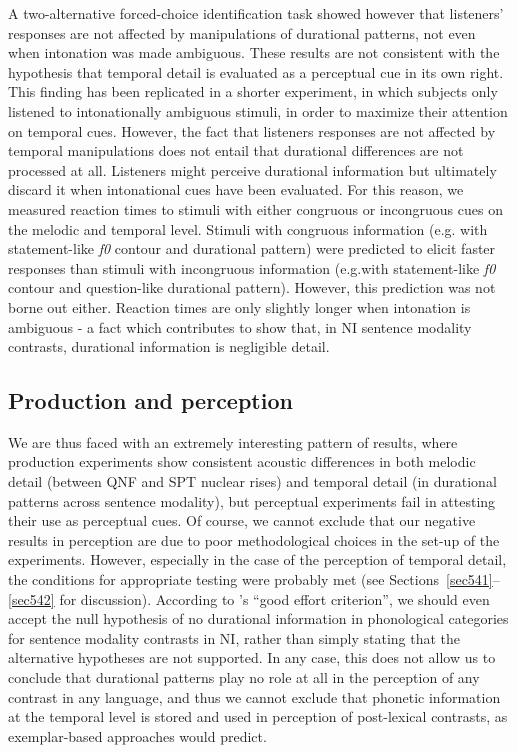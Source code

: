 A two-alternative forced-choice identification task showed however that listeners' responses are not affected by manipulations of durational patterns, not even when intonation was made ambiguous. These results are not consistent with the hypothesis that temporal detail is evaluated as a perceptual cue in its own right. This finding has been replicated in a shorter experiment, in which subjects only listened to intonationally ambiguous stimuli, in order to maximize their attention on temporal cues. However, the fact that listeners responses are not affected by temporal manipulations does not entail that durational differences are not processed at all. Listeners might perceive durational information but ultimately discard it when intonational cues have been evaluated. For this reason, we measured reaction times to stimuli with either congruous or incongruous cues on the melodic and temporal level. Stimuli with congruous information (e.g. with statement-like \textit{f0} contour and durational pattern) were predicted to elicit faster responses than stimuli with incongruous information (e.g.with statement-like \textit{f0} contour and question-like durational pattern). However, this prediction was not borne out either. Reaction times are only slightly longer when intonation is ambiguous - a fact which contributes to show that, in NI sentence modality contrasts, durational information is negligible detail.

\subsection{Production and perception}\label{sec613}
We are thus faced with an extremely interesting pattern of results, where production experiments show consistent acoustic differences in both melodic detail (between QNF and SPT nuclear rises) and temporal detail (in durational patterns across sentence modality), but perceptual experiments fail in attesting their use as perceptual cues. Of course, we cannot exclude that our negative results in perception are due to poor methodological choices in the set-up of the experiments. However, especially in the case of the perception of temporal detail, the conditions for appropriate testing were probably met (see Sections~\ref{sec541}--\ref{sec542} for discussion). According to \citeauthor{frick1995accepting}'s \citeyearpar{frick1995accepting} ``good effort criterion'', we should even accept the null hypothesis of no durational information in phonological categories for sentence modality contrasts in NI, rather than simply stating that the alternative hypotheses are not supported. In any case, this does not allow us to conclude that durational patterns play no role at all in the perception of any contrast in any language, and thus we cannot exclude that phonetic information at the temporal level is stored and used in perception of post-lexical contrasts, as exemplar-based approaches would predict.


